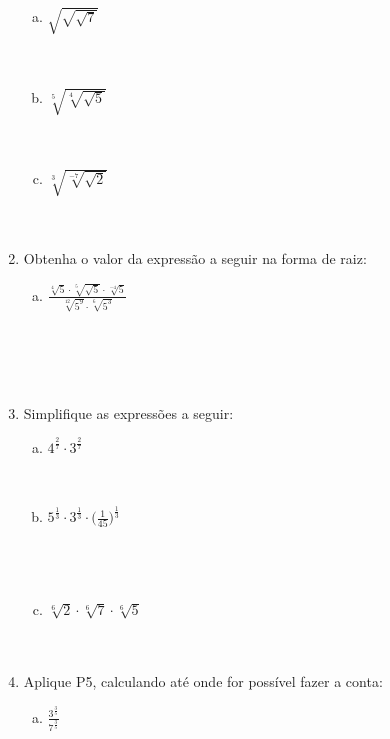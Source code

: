 \documentclass[a4paper,14pt]{article}
\begin{document}
\begin{multicols}{2}
\begin{enumerate}
\begin{enumerate}[a)]
        	\item $\sqrt{\sqrt{\sqrt{7}}}$\\\\\\
        	\item $\sqrt[5]{\sqrt[4]{\sqrt{5}}}$\\\\\\
        	\item $\sqrt[3]{\sqrt[-7]{\sqrt{2}}}$\\\\\\
        \end{enumerate}
        \item Obtenha o valor da expressão a seguir na forma de raiz:
        \begin{enumerate}[a)]
        	\item $\frac{\sqrt[4]{5} \cdot \sqrt[5]{\sqrt{5}} \cdot \sqrt[-4]{5}}{\sqrt[12]{5^9} \cdot \sqrt[6]{5^3}}$\\\\\\\\\\
        \end{enumerate}
        \item Simplifique as expressões a seguir:
        \begin{enumerate}[a)]
        	\item $4^\frac{2}{7} \cdot 3^\frac{2}{7}$\\\\\\
        	\item $5^\frac{1}{3} \cdot 3^\frac{1}{3} \cdot \bigg(\frac{1}{45}\bigg)^\frac{1}{3}$\\\\\\\\
        	\item $\sqrt[6]{2} \cdot \sqrt[6]{7} \cdot \sqrt[6]{5}$\\\\\\
        \end{enumerate}
        \item Aplique P5, calculando até onde for possível fazer a conta:
        \begin{enumerate}[a)]
        	\item $\frac{3^\frac{3}{5}}{7^\frac{3}{5}}$\\\\\\

\end{enumerate}
\end{enumerate}
\end{multicols}
\end{document}
